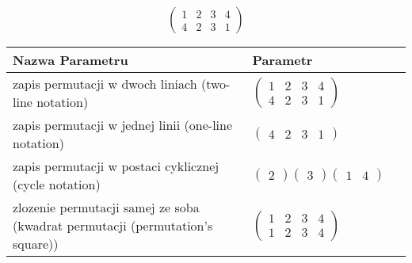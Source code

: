 \documentclass[12pt]{article}
\begin{document}
\subsection{}
\begin{center}
\[
\begin{pmatrix}
	1 & 2 & 3 & 4 \\ 
	4 & 2 & 3 & 1 
\end{pmatrix}
\]

\begin{tabular}{|m{0.6\linewidth}|m{0.4\linewidth}|}
	\hline
	Nazwa Parametru & Parametr \\
	\hline
	zapis permutacji w dwoch liniach (two-line notation) & $\begin{pmatrix} 1 & 2 & 3 & 4 \\ 
4 & 2 & 3 & 1 \end{pmatrix}$ \\ 
	\hline
	zapis permutacji w jednej linii (one-line notation) & $\begin{pmatrix} 4 & 2 & 3 & 1 \end{pmatrix}$ \\ 
	\hline
	zapis permutacji w postaci cyklicznej (cycle notation) & $\begin{pmatrix} 2 \end{pmatrix} \begin{pmatrix} 3 \end{pmatrix} \begin{pmatrix} 1 & 4 \end{pmatrix} $ \\ 
	\hline
	zlozenie permutacji samej ze soba (kwadrat permutacji (permutation's square)) & $\begin{pmatrix} 1 & 2 & 3 & 4 \\ 
1 & 2 & 3 & 4 \end{pmatrix}$ \\ 
	\hline
\end{tabular}
\end{center}
\end{document}
